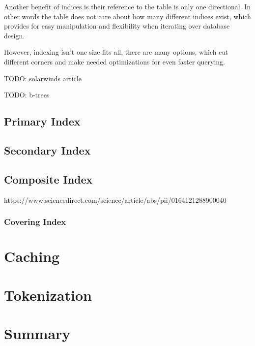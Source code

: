 \documentclass[10pt,a4paper]{article}
\begin{document}
Another benefit of indices is their reference to the table is only one directional. In other words the table does not care about how many different indices exist, which provides for easy manipulation and flexibility when iterating over database design.

However, indexing isn't one size fits all, there are many options, which cut different corners and make needed optimizations for even faster querying.

TODO: solarwinds article

TODO: b-trees

\subsection{Primary Index}
\subsection{Secondary Index}
\subsection{Composite Index}
https://www.sciencedirect.com/science/article/abs/pii/0164121288900040
\subsubsection{Covering Index}

\section{Caching}
\lipsum[2]

\section{Tokenization}
\lipsum[1]

\section{Summary}
\lipsum[1]

\newpage
\end{document}
